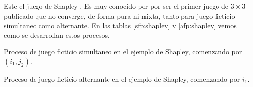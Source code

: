 

Este el juego de Shapley \cite{shapley:3x3}. Es muy conocido por por ser el primer juego de $3 \times 3$ publicado que no converge, de forma pura ni mixta, tanto para juego ficticio simultaneo como alternante. En las tablas \ref{sfp:shapley} y \ref{afp:shapley} vemos como se desarrollan estos procesos.


\begin{table} %
    \centering
    
    \caption{Proceso de juego ficticio simultaneo en el ejemplo de Shapley, comenzando por $(i_1, j_2)$.}
    \label{sfp:shapley}
\end{table}
\begin{table} %
    \centering
    
    \caption{Proceso de juego ficticio alternante en el ejemplo de Shapley, comenzando por $i_1$.}
    \label{afp:shapley}
\end{table}

